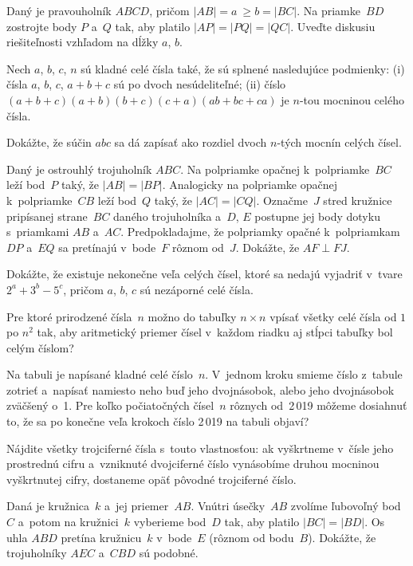 {%
Daný je pravouholník $ABCD$, pričom $|AB| = a~\ge b = |BC|$.
Na priamke~$BD$ zostrojte body $P$ a~$Q$ tak, aby platilo
$|AP| = |PQ| = |QC|$. Uveďte diskusiu riešiteľnosti vzhľadom na dĺžky
$a$, $b$.
}

{%
Nech $a$, $b$, $c$, $n$ sú kladné celé čísla také, že sú splnené
nasledujúce podmienky:
\ite(i) čísla $a$, $b$, $c$, $a+b+c$ sú po dvoch nesúdeliteľné;
\ite(ii) číslo $(a+b+c)(a+b)(b+c)(c+a)(ab+bc+ca)$ je $n$-tou
mocninou celého čísla.

Dokážte, že súčin $abc$ sa dá zapísať ako rozdiel dvoch $n$-tých
mocnín celých čísel.
}

{%
Daný je ostrouhlý trojuholník $ABC$. Na polpriamke
opačnej k~polpriamke~$BC$ leží bod~$P$ taký, že $|AB| = |BP|$. Analogicky na
polpriamke opačnej k~polpriamke~$CB$ leží bod~$Q$ taký, že $|AC| = |CQ|$.
Označme~$J$ stred kružnice pripísanej strane~$BC$ daného trojuholníka
a~$D$, $E$ postupne jej body dotyku s~priamkami $AB$ a~$AC$. Predpokladajme, že polpriamky
opačné k~polpriamkam $DP$ a~$EQ$ sa pretínajú v~bode~$F$ rôznom od~$J$.
Dokážte, že $AF \perp FJ$.
}

{%
Dokážte, že existuje nekonečne veľa celých
čísel, ktoré sa nedajú vyjadriť v~tvare ${2^a+3^b-5^c}$, pričom $a$, $b$, $c$
sú nezáporné celé čísla.}

{%
Pre ktoré prirodzené čísla~$n$ možno do tabuľky $n \times n$ vpísať
všetky celé čísla od $1$ po $n^2$
tak, aby aritmetický priemer čísel v~každom riadku
aj stĺpci tabuľky bol celým číslom?}

{%
Na tabuli je napísané kladné celé číslo~$n$. V~jednom kroku smieme
číslo z~tabule zotrieť a~napísať namiesto neho buď jeho dvojnásobok,
alebo jeho dvojnásobok zväčšený o~1. Pre koľko počiatočných
čísel~$n$ rôznych od~2\,019 môžeme dosiahnuť to, že sa po
konečne veľa krokoch číslo 2\,019 na tabuli objaví?}

{%
Nájdite všetky trojciferné čísla s~touto vlastnosťou:
ak vyškrtneme v~čísle jeho prostrednú cifru a~vzniknuté
dvojciferné číslo vynásobíme druhou mocninou vyškrtnutej cifry,
dostaneme opäť pôvodné trojciferné číslo.}

{%
Daná je kružnica~$k$ a~jej priemer~$AB$. Vnútri úsečky~$AB$
zvolíme ľubovoľný bod~$C$ a~potom na kružnici~$k$ vyberieme bod~$D$
tak, aby platilo $|BC|=|BD|$. Os uhla $ABD$ pretína
kružnicu~$k$ v~bode~$E$ (rôznom od bodu~$B$).
Dokážte, že trojuholníky $AEC$ a~$CBD$ sú podobné.}

